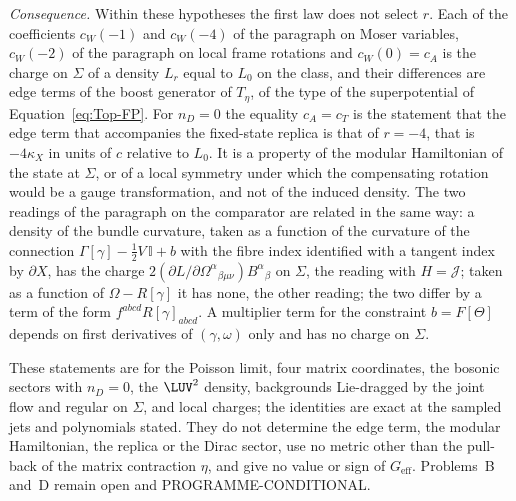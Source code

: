 \emph{Consequence.} Within these hypotheses the first law does not select \(r\). Each of the coefficients \(c_W(-1)\) and \(c_W(-4)\) of the paragraph on Moser variables, \(c_W(-2)\) of the paragraph on local frame rotations and \(c_W(0)=c_A\) is the charge on \(\Sigma\) of a density \(L_r\) equal to \(L_0\) on the class, and their differences are edge terms of the boost generator of \(T_\eta\), of the type of the superpotential of Equation~\eqref{eq:Top-FP}. For \(n_D=0\) the equality \(c_A=c_T\) is the statement that the edge term that accompanies the fixed-state replica is that of \(r=-4\), that is \(-4\kappa_X\) in units of \(c\) relative to \(L_0\). It is a property of the modular Hamiltonian of the state at \(\Sigma\), or of a local symmetry under which the compensating rotation would be a gauge transformation, and not of the induced density. The two readings of the paragraph on the comparator are related in the same way: a density of the bundle curvature, taken as a function of the curvature of the connection \(\Gamma[\gamma]-\tfrac12V\,\mathbb I+b\) with the fibre index identified with a tangent index by \(\partial X\), has the charge \(2(\partial L/\partial\Omega^\alpha{}_{\beta\mu\nu})B^\alpha{}_\beta\) on \(\Sigma\), the reading with \(H=\mathcal J\); taken as a function of \(\Omega-R[\gamma]\) it has none, the other reading; the two differ by a term of the form \(f^{abcd}R[\gamma]_{abcd}\). A multiplier term for the constraint \(b=F[\Theta]\) depends on first derivatives of \((\gamma,\omega)\) only and has no charge on \(\Sigma\).

These statements are for the Poisson limit, four matrix coordinates, the bosonic sectors with \(n_D=0\), the \(\LUV^2\) density, backgrounds Lie-dragged by the joint flow and regular on \(\Sigma\), and local charges; the identities are exact at the sampled jets and polynomials stated. They do not determine the edge term, the modular Hamiltonian, the replica or the Dirac sector, use no metric other than the pull-back of the matrix contraction \(\eta\), and give no value or sign of \(G_{\mathrm{eff}}\). Problems~B and~D remain open and PROGRAMME-CONDITIONAL.
